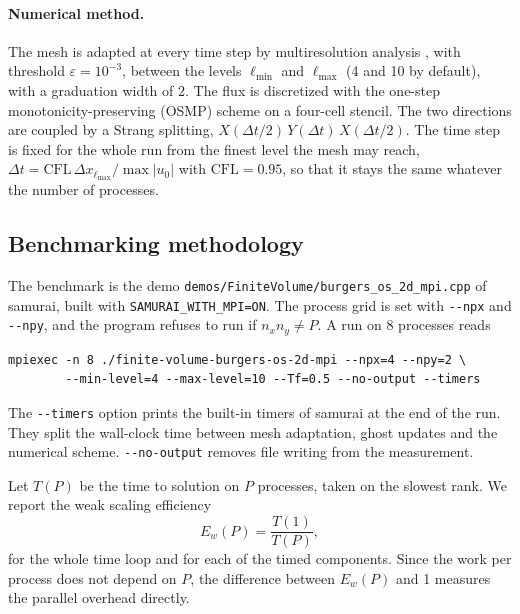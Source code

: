 \paragraph{Numerical method.}
The mesh is adapted at every time step by multiresolution analysis
\cite{cohen_fully_2003,bellotti_multidimensional_2022}, with threshold
$\varepsilon = 10^{-3}$, between the levels $\ell_{\min}$ and $\ell_{\max}$
(4 and 10 by default), with a graduation width of 2. The flux is discretized
with the one-step monotonicity-preserving (OSMP) scheme \cite{daru_high_2004}
on a four-cell stencil. The two directions are coupled by a Strang splitting,
$X(\Delta t/2)\,Y(\Delta t)\,X(\Delta t/2)$. The time step is fixed for the
whole run from the finest level the mesh may reach,
$\Delta t = \mathrm{CFL}\,\Delta x_{\ell_{\max}} / \max|u_0|$ with
$\mathrm{CFL} = 0.95$, so that it stays the same whatever the number of
processes.




\subsection{Benchmarking methodology}

The benchmark is the demo \texttt{demos/FiniteVolume/burgers\_os\_2d\_mpi.cpp}
of samurai, built with \texttt{SAMURAI\_WITH\_MPI=ON}. The process grid is set
with \texttt{-{}-npx} and \texttt{-{}-npy}, and the program refuses to run if
$n_x n_y \neq P$. A run on 8 processes reads
\begin{verbatim}
mpiexec -n 8 ./finite-volume-burgers-os-2d-mpi --npx=4 --npy=2 \
        --min-level=4 --max-level=10 --Tf=0.5 --no-output --timers
\end{verbatim}

The \texttt{-{}-timers} option prints the built-in timers of samurai at the end
of the run. They split the wall-clock time between mesh adaptation, ghost
updates and the numerical scheme. \texttt{-{}-no-output} removes file writing
from the measurement.

Let $T(P)$ be the time to solution on $P$ processes, taken on the slowest rank.
We report the weak scaling efficiency
\begin{equation}\label{eq:specs:samurai:burgers:weak-efficiency}
  E_w(P) = \frac{T(1)}{T(P)},
\end{equation}
for the whole time loop and for each of the timed components. Since the work
per process does not depend on $P$, the difference between $E_w(P)$ and 1
measures the parallel overhead directly.

